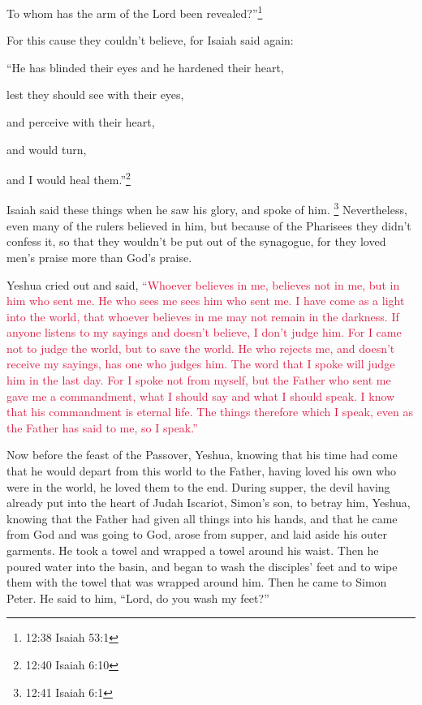 To whom has the arm of the Lord been revealed?”\footnote{12:38 Isaiah 53:1}

\myverse{}For this cause they couldn’t believe, for Isaiah said again:

\myverse{}“He has blinded their eyes and he hardened their heart,

lest they should see with their eyes,

and perceive with their heart,

and would turn,

and I would heal them.”\footnote{12:40 Isaiah 6:10}

\myverse{}Isaiah said these things when he saw his glory, and spoke of
him.
\footnote{12:41 Isaiah 6:1}
\myverse{}Nevertheless, even many of the rulers believed in him, but because of the
Pharisees they didn’t confess it, so that they wouldn’t be put out of the synagogue,
\myverse{}for they loved men’s praise more than God’s praise.

\myverse{}Yeshua cried out and said,
\textcolor{crimson}{“Whoever believes in me, believes not in me, but in him who sent me.
}
\myverse{}\textcolor{crimson}{He who sees me sees him who sent me.
}
\myverse{}\textcolor{crimson}{I have come as a light into the world, that whoever believes in me may
	not remain in the darkness.
}
\myverse{}\textcolor{crimson}{If anyone listens to my sayings and doesn’t believe, I don’t judge him.
	For I came not to judge the world, but to save the world.
}
\myverse{}\textcolor{crimson}{He who rejects me, and doesn’t receive my sayings, has one who judges
	him. The word that I spoke will judge him in the last day.
}
\myverse{}\textcolor{crimson}{For I spoke not from myself, but the Father who sent me gave me a commandment,
	what I should say and what I should speak.
}
\myverse{}\textcolor{crimson}{I know that his commandment is eternal life. The things therefore which
	I speak, even as the Father has said to me, so I speak.”}


\mychapter{} \myverse*{}Now before the feast of the Passover, Yeshua, knowing that his
time had come that he would depart from this world to the Father, having loved his own who were in the
world, he loved them to the end.
\myverse{}During supper, the devil having already put into the heart of Judah Iscariot,
Simon’s son, to betray him,
\myverse{}Yeshua, knowing that the Father had given all things into his hands, and that
he came from God and was going to God,
\myverse{}arose from supper, and laid aside his outer garments. He took a towel and wrapped
a towel around his waist.
\myverse{}Then he poured water into the basin, and began to wash the disciples’ feet
and to wipe them with the towel that was wrapped around him.
\myverse{}Then he came to Simon Peter. He said to him, “Lord, do you wash my feet?”

